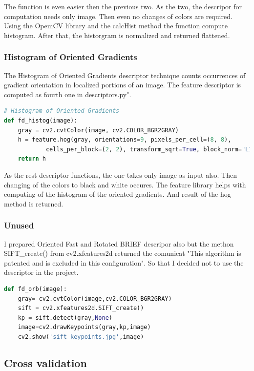 \documentclass[12pt]{article}
\begin{document}
The function is even easier then the previous two. As the two, the descripor for computation needs only image. Then even no changes of colors are required. Using the OpemCV library and the calcHist method the function compute histogram. After that, the historgram is normalized and returned flattened.

\subsubsection{Histogram of Oriented Gradients}

The Histogram of Oriented Gradients descriptor technique counts occurrences of gradient orientation in localized portions of an image.
The feature descriptor is computed as fourth one in descriptors.py".

\begin{lstlisting}[language=Python]
# Histogram of Oriented Gradients
def fd_histog(image):
    gray = cv2.cvtColor(image, cv2.COLOR_BGR2GRAY)
    h = feature.hog(gray, orientations=9, pixels_per_cell=(8, 8),
            cells_per_block=(2, 2), transform_sqrt=True, block_norm="L1")
    return h
\end{lstlisting} 

As the rest descriptor functions, the one takes only image as input also. Then changing of the colors to black and white occures. The feature library helps with computing of the histogram of the oriented gradients. And result of the hog method is returned.

\subsubsection{Unused}

I prepared Oriented Fast and Rotated BRIEF descripor also but the methon SIFT\_create() from cv2.xfeatures2d returned the comunicat "This algorithm is patented and is excluded in this configuration". So that I decided not to use the descriptor in the project. 

\begin{lstlisting}[language=Python]
def fd_orb(image):
    gray= cv2.cvtColor(image,cv2.COLOR_BGR2GRAY)
    sift = cv2.xfeatures2d.SIFT_create()
    kp = sift.detect(gray,None)
    image=cv2.drawKeypoints(gray,kp,image)
    cv2.show('sift_keypoints.jpg',image)
\end{lstlisting} 
 
\subsection{Cross validation}
\end{document}
